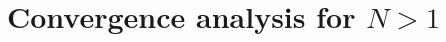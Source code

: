 \documentclass[10pt]{article}
\begin{document}
\section{Convergence analysis for $N > 1$}

%
%
\end{document}
